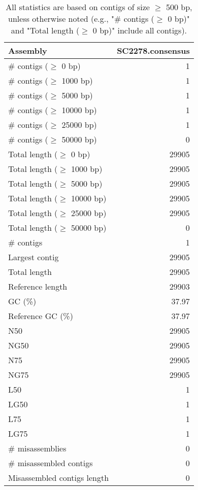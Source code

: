 \documentclass[12pt,a4paper]{article}
\begin{document}
\begin{table}[ht]
\begin{center}
\caption{All statistics are based on contigs of size $\geq$ 500 bp, unless otherwise noted (e.g., "\# contigs ($\geq$ 0 bp)" and "Total length ($\geq$ 0 bp)" include all contigs).}
\begin{tabular}{|l*{1}{|r}|}
\hline
Assembly & SC2278.consensus \\ \hline
\# contigs ($\geq$ 0 bp) & 1 \\ \hline
\# contigs ($\geq$ 1000 bp) & 1 \\ \hline
\# contigs ($\geq$ 5000 bp) & 1 \\ \hline
\# contigs ($\geq$ 10000 bp) & 1 \\ \hline
\# contigs ($\geq$ 25000 bp) & 1 \\ \hline
\# contigs ($\geq$ 50000 bp) & 0 \\ \hline
Total length ($\geq$ 0 bp) & 29905 \\ \hline
Total length ($\geq$ 1000 bp) & 29905 \\ \hline
Total length ($\geq$ 5000 bp) & 29905 \\ \hline
Total length ($\geq$ 10000 bp) & 29905 \\ \hline
Total length ($\geq$ 25000 bp) & 29905 \\ \hline
Total length ($\geq$ 50000 bp) & 0 \\ \hline
\# contigs & 1 \\ \hline
Largest contig & 29905 \\ \hline
Total length & 29905 \\ \hline
Reference length & 29903 \\ \hline
GC (\%) & 37.97 \\ \hline
Reference GC (\%) & 37.97 \\ \hline
N50 & 29905 \\ \hline
NG50 & 29905 \\ \hline
N75 & 29905 \\ \hline
NG75 & 29905 \\ \hline
L50 & 1 \\ \hline
LG50 & 1 \\ \hline
L75 & 1 \\ \hline
LG75 & 1 \\ \hline
\# misassemblies & 0 \\ \hline
\# misassembled contigs & 0 \\ \hline
Misassembled contigs length & 0 \\ \hline

\end{tabular}
\end{center}
\end{table}
\end{document}
